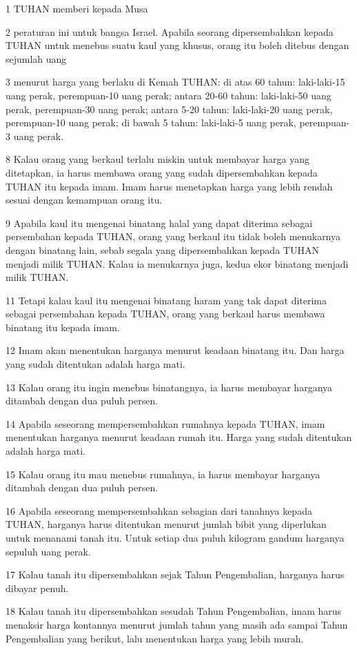 \par 1 TUHAN memberi kepada Musa
\par 2 peraturan ini untuk bangsa Israel. Apabila seorang dipersembahkan kepada TUHAN untuk menebus suatu kaul yang khusus, orang itu boleh ditebus dengan sejumlah uang
\par 3 menurut harga yang berlaku di Kemah TUHAN: di atas 60 tahun: laki-laki-15 uang perak, perempuan-10 uang perak; antara 20-60 tahun: laki-laki-50 uang perak, perempuan-30 uang perak; antara 5-20 tahun: laki-laki-20 uang perak, perempuan-10 uang perak; di bawah 5 tahun: laki-laki-5 uang perak, perempuan-3 uang perak.
\par 8 Kalau orang yang berkaul terlalu miskin untuk membayar harga yang ditetapkan, ia harus membawa orang yang sudah dipersembahkan kepada TUHAN itu kepada imam. Imam harus menetapkan harga yang lebih rendah sesuai dengan kemampuan orang itu.
\par 9 Apabila kaul itu mengenai binatang halal yang dapat diterima sebagai persembahan kepada TUHAN, orang yang berkaul itu tidak boleh menukarnya dengan binatang lain, sebab segala yang dipersembahkan kepada TUHAN menjadi milik TUHAN. Kalau ia menukarnya juga, kedua ekor binatang menjadi milik TUHAN.
\par 11 Tetapi kalau kaul itu mengenai binatang haram yang tak dapat diterima sebagai persembahan kepada TUHAN, orang yang berkaul harus membawa binatang itu kepada imam.
\par 12 Imam akan menentukan harganya menurut keadaan binatang itu. Dan harga yang sudah ditentukan adalah harga mati.
\par 13 Kalau orang itu ingin menebus binatangnya, ia harus membayar harganya ditambah dengan dua puluh persen.
\par 14 Apabila seseorang mempersembahkan rumahnya kepada TUHAN, imam menentukan harganya menurut keadaan rumah itu. Harga yang sudah ditentukan adalah harga mati.
\par 15 Kalau orang itu mau menebus rumahnya, ia harus membayar harganya ditambah dengan dua puluh persen.
\par 16 Apabila seseorang mempersembahkan sebagian dari tanahnya kepada TUHAN, harganya harus ditentukan menurut jumlah bibit yang diperlukan untuk menanami tanah itu. Untuk setiap dua puluh kilogram gandum harganya sepuluh uang perak.
\par 17 Kalau tanah itu dipersembahkan sejak Tahun Pengembalian, harganya harus dibayar penuh.
\par 18 Kalau tanah itu dipersembahkan sesudah Tahun Pengembalian, imam harus menaksir harga kontannya menurut jumlah tahun yang masih ada sampai Tahun Pengembalian yang berikut, lalu menentukan harga yang lebih murah.
